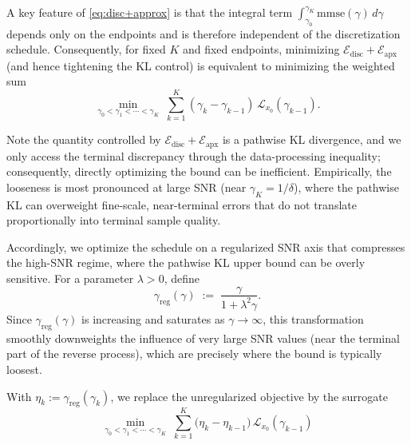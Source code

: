 \documentclass[11pt]{article}
\theoremstyle{definition}
\numberwithin{equation}{section}
\begin{document}
A key feature of \eqref{eq:disc+approx} is that the integral term
$\int_{\gamma_0}^{\gamma_K}\mathrm{mmse}(\gamma)\,d\gamma$ depends only on the endpoints and is therefore
independent of the discretization schedule. Consequently, for fixed $K$ and fixed endpoints,
minimizing $\mathcal E_{\mathrm{disc}}+\mathcal E_{\mathrm{apx}}$ (and hence tightening the KL control) is
equivalent to minimizing the weighted sum
\[
\min_{\gamma_0<\gamma_1<\cdots<\gamma_K}\;
\sum_{k=1}^K(\gamma_k-\gamma_{k-1})\,\mathcal L_{x_0}(\gamma_{k-1}).
\]

Note the quantity controlled by
$\mathcal E_{\mathrm{disc}}+\mathcal E_{\mathrm{apx}}$ is a pathwise KL divergence, and we only access the
terminal discrepancy through the data-processing inequality; consequently, directly optimizing the bound can be
inefficient. Empirically, the looseness is most pronounced at large SNR (near $\gamma_K=1/\delta$), where the
pathwise KL can overweight fine-scale, near-terminal errors that do not translate proportionally into terminal
sample quality.

Accordingly, we optimize the schedule on a regularized SNR axis that compresses the high-SNR regime, where the
pathwise KL upper bound can be overly sensitive. For a parameter $\lambda>0$, define
\[
\gamma_{\mathrm{reg}}(\gamma)\;:=\;\frac{\gamma}{1+\lambda^2\gamma}.
\]
Since $\gamma_{\mathrm{reg}}(\gamma)$ is increasing and saturates as $\gamma\to\infty$, this transformation
smoothly downweights the influence of very large SNR values (near the terminal part of the reverse process), which
are precisely where the bound is typically loosest.

With $\eta_k:=\gamma_{\mathrm{reg}}(\gamma_k)$, we replace the unregularized objective by the surrogate
\begin{equation}
\label{eq:schedule-objective-reg}
\min_{\gamma_0<\gamma_1<\cdots<\gamma_K}\;
\sum_{k=1}^K\big(\eta_k-\eta_{k-1}\big)\,\mathcal L_{x_0}(\gamma_{k-1})
\end{equation}
\end{document}
